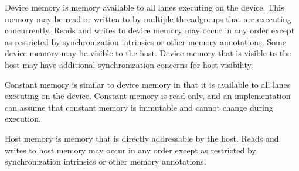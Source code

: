 
\p Device memory is memory available to all \gls{lane}s executing on the device.
This memory may be read or written to by multiple \gls{threadgroup}s that are
executing concurrently. Reads and writes to device memory may occur in any order
except as restricted by synchronization intrinsics or other memory annotations.
Some device memory may be visible to the host. Device memory that is visible to
the host may have additional synchronization concerns for host visibility.


\p Constant memory is similar to device memory in that it is available to all
\gls{lane}s executing on the device. Constant memory is read-only, and an
implementation can assume that constant memory is immutable and cannot change
during execution.


\p Host memory is memory that is directly addressable by the host. Reads and writes
to host memory may occur in any order except as restricted by synchronization
intrinsics or other memory annotations.
